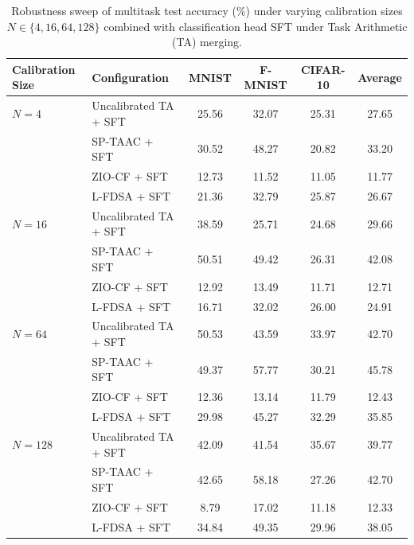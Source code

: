 \documentclass{article}
\theoremstyle{plain}
\theoremstyle{definition}
\theoremstyle{remark}
\begin{document}
\begin{table}[h]
\caption{Robustness sweep of multitask test accuracy (\%) under varying calibration sizes $N \in \{4, 16, 64, 128\}$ combined with classification head SFT under Task Arithmetic (TA) merging.}
\label{tab:ta_scarcity_results}
\vskip 0.1in
\centering
\begin{footnotesize}
\begin{tabular}{llcccc}
\toprule
Calibration Size & Configuration & MNIST & F-MNIST & CIFAR-10 & Average \\
\midrule
$N=4$ & Uncalibrated TA + SFT & 25.56 & 32.07 & 25.31 & 27.65 \\
& SP-TAAC + SFT & 30.52 & 48.27 & 20.82 & 33.20 \\
& ZIO-CF + SFT & 12.73 & 11.52 & 11.05 & 11.77 \\
& L-FDSA + SFT & 21.36 & 32.79 & 25.87 & 26.67 \\
\midrule
$N=16$ & Uncalibrated TA + SFT & 38.59 & 25.71 & 24.68 & 29.66 \\
& SP-TAAC + SFT & 50.51 & 49.42 & 26.31 & 42.08 \\
& ZIO-CF + SFT & 12.92 & 13.49 & 11.71 & 12.71 \\
& L-FDSA + SFT & 16.71 & 32.02 & 26.00 & 24.91 \\
\midrule
$N=64$ & Uncalibrated TA + SFT & 50.53 & 43.59 & 33.97 & 42.70 \\
& SP-TAAC + SFT & 49.37 & 57.77 & 30.21 & 45.78 \\
& ZIO-CF + SFT & 12.36 & 13.14 & 11.79 & 12.43 \\
& L-FDSA + SFT & 29.98 & 45.27 & 32.29 & 35.85 \\
\midrule
$N=128$ & Uncalibrated TA + SFT & 42.09 & 41.54 & 35.67 & 39.77 \\
& SP-TAAC + SFT & 42.65 & 58.18 & 27.26 & 42.70 \\
& ZIO-CF + SFT & 8.79 & 17.02 & 11.18 & 12.33 \\
& L-FDSA + SFT & 34.84 & 49.35 & 29.96 & 38.05 \\
\bottomrule
\end{tabular}
\end{footnotesize}
\vskip -0.1in
\end{table}
\end{document}
